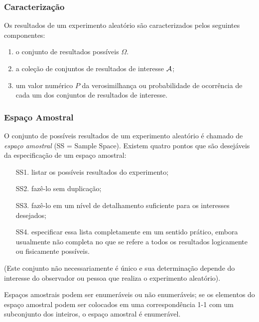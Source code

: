 \begin{frame}
\frametitle{\textbf{Caracterização}}
\baselineskip=13pt
\begin{block}{}

Os resultados de um experimento aleatório são caracterizados pelos
seguintes componentes:

\begin{enumerate}
\item o conjunto de resultados possíveis $\Omega.$ 
\item a coleção de conjuntos de resultados de interesse ${\cal A}$;
\item um valor numérico $P$ da verosimilhança ou probabilidade de
ocorrência de cada um dos conjuntos de resultados de interesse.
\end{enumerate}

\end{block}
\end{frame}

%
\begin{frame}
\frametitle{\textbf{Espaço Amostral}}
\baselineskip=13pt
\begin{block}{}


O conjunto de possíveis resultados de um experimento aleatório é
chamado de {\em espaço amostral}  (SS = Sample Space). Existem quatro pontos que são
desejáveis da especificação de um espaço amostral:

\begin{enumerate}
\item[SS1.] listar os possíveis resultados do experimento;

\item[SS2.] fazê-lo sem duplicação;

\item[SS3.] fazê-lo em um nível de detalhamento suficiente para os
interesses desejados;

\item[SS4.] especificar essa lista completamente em um sentido
prático, embora usualmente não completa no que se refere a todos os
resultados logicamente ou fisicamente possíveis.
\end{enumerate}

(Este conjunto não necessariamente é único e sua
determinação depende do interesse do observador ou pessoa que realiza o
experimento aleatório).

\end{block}
		Espaços amostrais podem ser enumeráveis ou não enumeráveis;
se os elementos do espaço amostral podem ser colocados em uma correspondência 1-1 com um subconjunto
dos inteiros, o espaço amostral é enumerável.
\end{frame}
%
%
%



